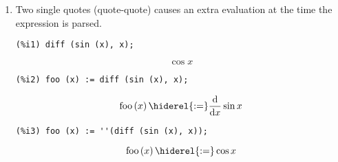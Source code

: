 \documentclass[12pt,leqno]{article}
\begin{document}
\begin{enumerate}
\item Two single quotes (quote-quote) causes an extra evaluation at the time the expression is parsed.
\begin{verbatim}
(%i1) diff (sin (x), x);
\end{verbatim}
\begin{dmath}[number={\(\mathop{\mathrm{\%o}_{1}}\)}]
\cos x
\end{dmath}
\begin{verbatim}
(%i2) foo (x) := diff (sin (x), x);
\end{verbatim}
\begin{dmath}[number={\(\mathop{\mathrm{\%o}_{2}}\)}]
\mathop{\mathrm{foo}}\left(x\right) \hiderel{:=} \frac{\mathrm{d}}{\mathop{\mathrm{d}x}}\sin x
\end{dmath}
\begin{verbatim}
(%i3) foo (x) := ''(diff (sin (x), x));
\end{verbatim}
\begin{dmath}[number={\(\mathop{\mathrm{\%o}_{3}}\)}]
\mathop{\mathrm{foo}}\left(x\right) \hiderel{:=} \cos x
\end{dmath}



\end{enumerate}
\end{document}
